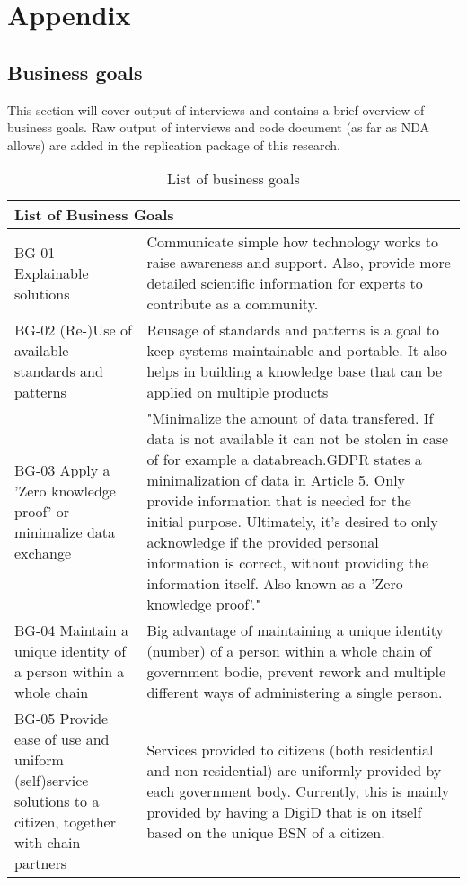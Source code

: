 
\chapter*{Appendix} %

\section*{Business goals}
This section will cover output of interviews and contains a brief overview of business goals. Raw output of interviews and code document (as far as NDA allows) are added in the replication package of this research.
\begin{table}
\begin{tabular}{ |p{5cm}||p{11cm}|}
 \hline
 \multicolumn{2}{|l|}{List of Business Goals} \\
 \hline
 BG-01 Explainable solutions   &   Communicate simple how technology works to raise awareness and support. Also, provide more detailed scientific information for experts to contribute as a community.     \\
 \hline
 BG-02 (Re-)Use of available standards and patterns &  Reusage of standards and patterns is a goal to keep systems maintainable and portable. It also helps in building a knowledge base that can be applied on multiple products \\
  \hline
 BG-03 Apply a 'Zero knowledge proof' or minimalize data exchange & "Minimalize the amount of data transfered. If data is not available it can not be stolen in case of for example a databreach.GDPR states a minimalization of data in Article 5. Only provide information that is needed for the initial purpose.
Ultimately, it's desired to only acknowledge if the provided personal information is correct, without providing the information itself. Also known as a 'Zero knowledge proof'."  \\
  \hline
BG-04 Maintain a unique identity of a person within a whole chain & Big advantage of maintaining a unique identity (number) of a person within a whole chain of government bodie, prevent rework and multiple different ways of administering a single person.  \\
  \hline
 BG-05 Provide ease of use and uniform (self)service solutions to a citizen, together with chain partners &  Services provided to citizens (both residential and non-residential) are uniformly provided by each government body. Currently, this is mainly provided by having a DigiD that is on itself based on the unique BSN of a citizen.\\
   \hline
\end{tabular}
\caption{List of business goals}
\label{table:2}
\end{table}

